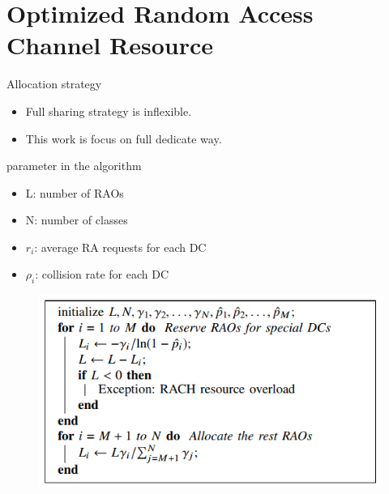 \documentclass{beamer}
\begin{document}
\section{Optimized Random Access Channel Resource}
\begin{frame} {Allocation strategy}
    \begin{itemize}
        \item {Full sharing strategy is inflexible.}
        \item {This work is focus on full dedicate way.}
    \end{itemize}
\end{frame}
\begin{frame}{parameter in the algorithm}
    \begin{itemize}
        \item {L: number of RAOs}
        \item {N: number of classes}
        \item {$r_i$: average RA requests for each DC}
        \item {$\rho_i$: collision rate for each DC}
    \end{itemize}
\end{frame}
\begin{frame}
    \begin{figure}[t]
    \centering
    \includegraphics[width=1\textwidth]{figures/3.png}
    \end{figure}
\end{frame}
\end{document}

